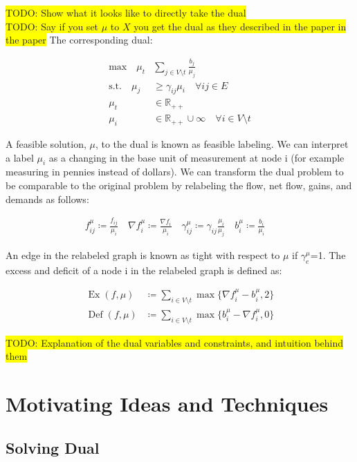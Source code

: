\documentclass[11pt]{article}
\theoremstyle{definition}
\theoremstyle{definition}
\newcommand{\R}{\mathbb{R}}
\newcommand{\fu}{f^{\mu}}
\newcommand{\nfiu}{\nabla \fu_i}
\newcommand{\biu}{b_{i}^{\mu}}
\DeclareMathOperator{\Ex}{Ex}
\DeclareMathOperator{\Def}{Def}
\newcommand{\todo}[1]{\colorbox{yellow}{TODO: #1}}
\begin{document}
\todo{Show what it looks like to directly take the dual}\\
\todo{Say if you set $\mu$ to $X$ you get the dual as they described in the paper in the paper}
\noindent The corresponding dual:
 
        \begin{align*}\tag{D}
        \text{max} \quad
        \mu_t &\sum_{j \in V \setminus t} \frac{b_j}{\mu_j}  \\
        \text{s.t.} \quad
        \mu_j &\geq \gamma_{ij}\mu_i \quad \forall ij \in E \\
        \mu_t &\in \R_{++} \\
        \mu_i &\in \R_{++} \cup \infty \quad \forall i \in V \setminus t
        \end{align*}  
        
A feasible solution, $\mu$, to the dual is known as feasible labeling. We can interpret a label $\mu_i$ as a changing in the base unit of measurement  at node i (for example measuring in pennies instead of dollars). We can transform the dual problem to be comparable to the original problem by relabeling the flow, net flow, gains, and demands as follows:

\begin{align*}
f_{ij}^\mu \coloneqq \frac{f_{ij}}{\mu_i} \quad
\nabla f_i^\mu \coloneqq \frac{\nabla f_i }{\mu_i} \quad
\gamma_{ij}^\mu \coloneqq \gamma_{ij} \frac{\mu_i}{\mu_j} \quad
b_i^\mu \coloneqq \frac{b_i}{\mu_i} \quad
\end{align*}

An edge in the relabeled graph is known as tight with respect to $\mu$ if $\gamma_e^\mu$=1. The excess and deficit of a node i in the relabeled graph is defined as:


\begin{align*}
\Ex(f,\mu)  &\coloneqq \sum_{i \in V \setminus t} \max \{ \nfiu - \biu, 2 \} \\
\Def(f,\mu) &\coloneqq \sum_{i \in V \setminus t} \max \{ \biu - \nfiu, 0 \}
\end{align*}

\todo{Explanation of the dual variables and constraints, and intuition behind them}
  
\section{Motivating Ideas and Techniques}
	\subsection{Solving Dual}
            
\end{document}
